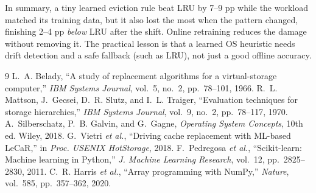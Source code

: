 \documentclass[10pt,a4paper]{article}
\begin{document}
In summary, a tiny learned eviction rule beat LRU by 7--9 pp while the workload matched its training data, but it also lost the most when the pattern changed, finishing 2--4 pp \emph{below} LRU after the shift. Online retraining reduces the damage without removing it. The practical lesson is that a learned OS heuristic needs drift detection and a safe fallback (such as LRU), not just a good offline accuracy.

\begin{thebibliography}{9}\small
{} L.~A. Belady, ``A study of replacement algorithms for a virtual-storage computer,'' \emph{IBM Systems Journal}, vol.~5, no.~2, pp.~78--101, 1966.
 R.~L. Mattson, J.~Gecsei, D.~R. Slutz, and I.~L. Traiger, ``Evaluation techniques for storage hierarchies,'' \emph{IBM Systems Journal}, vol.~9, no.~2, pp.~78--117, 1970.
 A.~Silberschatz, P.~B. Galvin, and G.~Gagne, \emph{Operating System Concepts}, 10th ed. Wiley, 2018.
 G.~Vietri \emph{et al.}, ``Driving cache replacement with ML-based LeCaR,'' in \emph{Proc. USENIX HotStorage}, 2018.
 F.~Pedregosa \emph{et al.}, ``Scikit-learn: Machine learning in Python,'' \emph{J. Machine Learning Research}, vol.~12, pp.~2825--2830, 2011.
 C.~R. Harris \emph{et al.}, ``Array programming with NumPy,'' \emph{Nature}, vol.~585, pp.~357--362, 2020.
\end{thebibliography}
\end{document}
